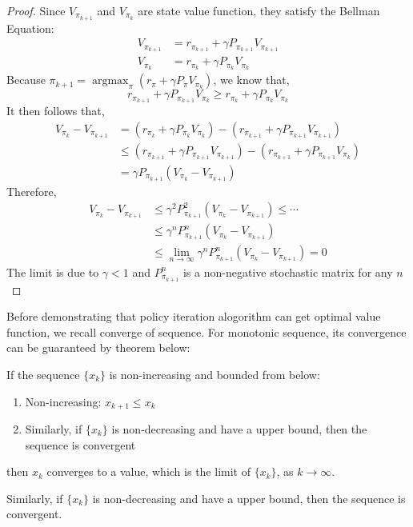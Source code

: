 \begin{proof}
    Since $V_{\pi_{k+1}}$ and $V_{\pi_{k}}$ are state value function, they satisfy the Bellman Equation:
    \begin{align*}
        V_{\pi_{k+1}} & = r_{\pi_{k+1}} + \gamma P_{\pi_{k+1}}V_{\pi_{k+1}} \\
        V_{\pi_{k}} & = r_{\pi_{k}} + \gamma P_{\pi_{k}}V_{\pi_{k}}
    \end{align*}
    Because $\pi_{k+1}=\mathop{\arg\max}_{\pi}(r_{\pi}+\gamma P_{\pi}V_{\pi_{k}})$, we know that,
    \begin{equation*}
        r_{\pi_{k+1}} + \gamma P_{\pi_{k+1}}V_{\pi_{k}} \ge r_{\pi_{k}} + \gamma P_{\pi_{k}}V_{\pi_{k}}
    \end{equation*}
    It then follows that,
    \begin{align*}
        V_{\pi_{k}} - V_{\pi_{k+1}} & = \left(r_{\pi_{k}} + \gamma P_{\pi_{k}}V_{\pi_{k}}\right) - \left(r_{\pi_{k+1}}+\gamma P_{\pi_{k+1}}V_{\pi_{k+1}}\right) \\
                                    & \le \left(r_{\pi_{k+1}} + \gamma P_{\pi_{k+1}}V_{\pi_{k+1}}\right) - \left(r_{\pi_{k+1}}+\gamma P_{\pi_{k+1}}V_{\pi_{k}}\right) \\
                                    & = \gamma P_{\pi_{k+1}}(V_{\pi_{k}}-V_{\pi_{k+1}})
    \end{align*}
    Therefore,
    \begin{align*}
    V_{\pi_{k}} - V_{\pi_{k+1}} & \le \gamma ^2 P_{\pi_{k+1}}^2(V_{\pi_{k}}-V_{\pi_{k+1}}) \le \cdots \\
                                & \le \gamma ^n P_{\pi_{k+1}}^n(V_{\pi_{k}}-V_{\pi_{k+1}}) \\
                                &\le \lim_{ n \to \infty }\gamma ^n P_{\pi_{k+1}}^n(V_{\pi_{k}}-V_{\pi_{k+1}}) = 0 
    \end{align*}
    The limit is due to $\gamma<1$ and $P_{\pi_{k+1}}^n$ is a non-negative stochastic matrix for any $n$
\end{proof}

Before demonstrating that policy iteration alogorithm can get optimal value function, we recall converge of sequence. For monotonic sequence, its convergence can be guaranteed by theorem below:
\begin{theorem}\label{thm:cms}
    If the sequence $\{x_{k}\}$ is non-increasing and bounded from below:
    \begin{enumerate}
        \item Non-increasing: $x_{k+1} \le x_{k}$
        \item Similarly, if $\{x_{k}\}$ is non-decreasing and have a upper bound, then the sequence is convergent
    \end{enumerate}
    then $x_{k}$ converges to a value, which is the limit of $\{x_{k}\}$, as $k\to \infty$.
\end{theorem}
Similarly, if $\{x_{k}\}$ is non-decreasing and have a upper bound, then the sequence is convergent.

